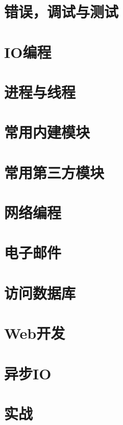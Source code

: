 \section{错误，调试与测试}
\section{IO编程}
\section{进程与线程}
\section{常用内建模块}
\section{常用第三方模块}
\section{网络编程}
\section{电子邮件}
\section{访问数据库}
\section{Web开发}
\section{异步IO}
\section{实战}
